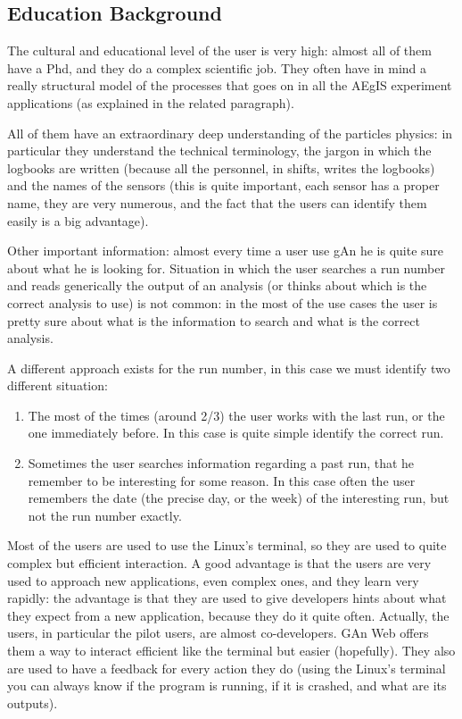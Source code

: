 \subsection{Education Background}
The cultural and educational level of the user is very high: almost all of them have a Phd, and they do a complex scientific job. They often have in mind a really structural model of the processes that goes on in all the AEgIS experiment applications (as explained in the related paragraph). 

All of them have an extraordinary deep understanding of the particles physics: in particular they understand the technical terminology, the jargon in which the logbooks are written (because all the personnel, in shifts, writes the logbooks) and the names of the sensors (this is quite important, each sensor has a proper name, they are very numerous, and the fact that the users can identify them easily is a big advantage). 

Other important information: almost every time a user use gAn he is quite sure about what he is looking for. Situation in which the user searches a run number and reads generically the output of an analysis (or thinks about which is the correct analysis to use) is not common: in the most of the use cases the user is pretty sure about what is the information to search and what is the correct analysis. 

A different approach exists for the run number, in this case we must identify two different situation:

\begin{enumerate}

\item The most of the times (around 2/3) the user works with the last run, or the one immediately before. In this case is quite simple identify the correct run.
\item Sometimes the user searches information regarding a past run, that he remember to be interesting for some reason. In this case often the user remembers the date (the precise day, or the week) of the interesting run, but not the run number exactly.

\end{enumerate}

Most of the users are used to use the Linux's terminal, so they are used to quite complex but efficient interaction. A good advantage is that the users are very used to approach new applications, even complex ones, and they learn very rapidly: the advantage is that they are used to give developers hints about what they expect from a new application, because they do it quite often. Actually, the users, in particular the pilot users, are almost co-developers. GAn Web offers them a way to interact efficient like the terminal but easier (hopefully). They also are used to have a feedback for every action they do (using the Linux's terminal you can always know if the program is running, if it is crashed, and what are its outputs).

